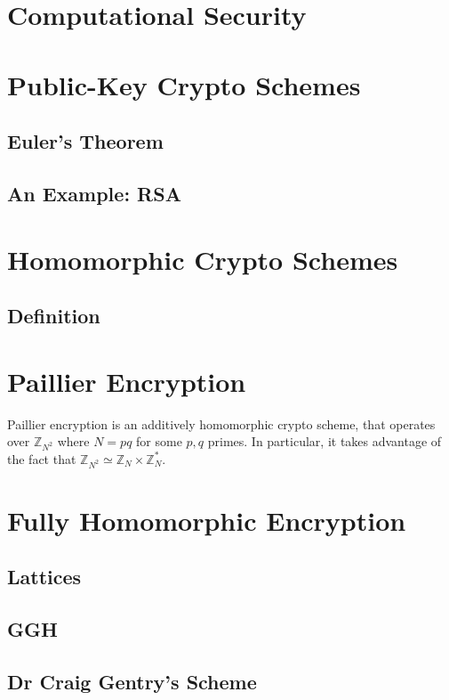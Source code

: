 \documentclass{article}
\theoremstyle{definition}
\newcommand{\Int}{\mathbb{Z}}
\begin{document}
\section{Computational Security}
\section{Public-Key Crypto Schemes}
\subsection{Euler's Theorem}
\subsection{An Example: RSA}
\section{Homomorphic Crypto Schemes}
\subsection{Definition}
\section{Paillier Encryption}
Paillier encryption is an additively homomorphic crypto scheme, that operates
over $\Int_{N^2}$ where $N = pq$ for some $p, q$ primes. In particular, it takes advantage of the fact that $\Int_{N^2}
\simeq \Int_{N} \times \Int_{N}^*$. 
\section{Fully Homomorphic Encryption}
\subsection{Lattices}
\subsection{GGH}
\subsection{Dr Craig Gentry's Scheme}

\printbibliography
\end{document}
